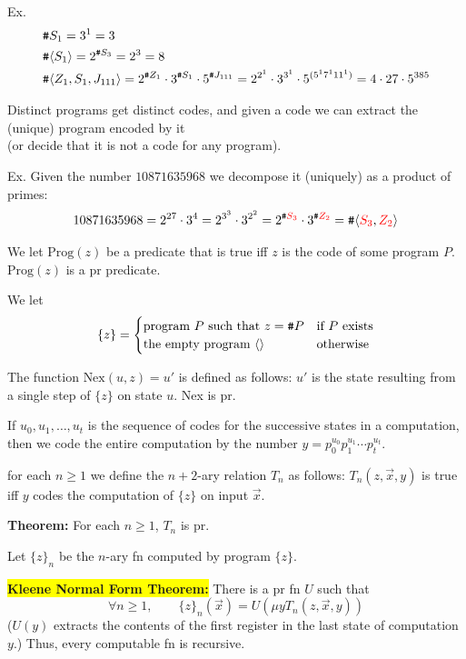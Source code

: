 \begin{frame}
Ex.  
\begin{align*}
& \texttt{\#} S_1=3^1=3 \\
& \texttt{\#} \langle S_1\rangle=2^{\texttt{\#} S_3}=2^3=8 \\
& \texttt{\#} \langle Z_1,S_1,J_{111}\rangle=2^{\texttt{\#} Z_1}\cdot
3^{\texttt{\#} S_1}\cdot 5^{\texttt{\#} J_{111}}=
2^{2^1}\cdot 3^{3^1}\cdot 5^{(5^17^111^1)}=4\cdot 27\cdot 5^{385}
\end{align*}

Distinct programs get distinct codes, and given a code we can extract
the (unique) program encoded by it \\
(or decide that it is not a code
for any program).

Ex. Given the number $10871635968$ we decompose it (uniquely) as a
product of primes:
$$
10871635968
=2^{27}\cdot 3^{4}
=2^{3^3}\cdot 3^{2^2}
=2^{\texttt{\#} \textcolor{red}{S_3}}\cdot 3^{\texttt{\#} \textcolor{red}{Z_2}}
=\texttt{\#}\langle \textcolor{red}{S_3},\textcolor{red}{Z_2}\rangle
$$
\end{frame}

\begin{frame}
We let $\text{Prog}(z)$ be a predicate that is true iff $z$ is the
code of some program $P$.  $\text{Prog}(z)$ is a pr predicate.


We let 
$$
\{z\}=\begin{cases}
\text{program $P$ such that $z=\texttt{\#} P$} & \text{if $P$ exists} \\
\text{the empty program $\langle\rangle$} & \text{otherwise}
\end{cases}
$$

The function $\text{Nex}(u,z)=u'$ is defined as follows: $u'$ is the
state resulting from a single step of $\{z\}$ on state $u$.  Nex is
pr.
\end{frame}

\begin{frame}
If $u_0,u_1,\ldots,u_t$ is the sequence of codes for the successive
states in a computation, then we code the entire computation by the
number $y=p_0^{u_0}p_1^{u_1}\cdots p_t^{u_t}$.  

 for each $n\ge 1$ we define the $n+2$-ary
relation $T_n$ as follows: $T_n(z,\vec{x},y)$ is true iff $y$ codes
the computation of $\{z\}$ on input $\vec{x}$.  

{\bf Theorem:} For each $n\ge 1$, $T_n$ is pr.

Let $\{z\}_n$ be the $n$-ary fn computed by program $\{z\}$.

\colorbox{yellow}{\bf Kleene Normal Form Theorem:}  
There is a pr fn $U$ such that
$$
\forall n\ge 1,\qquad
\{z\}_n(\vec{x})=U(\mu yT_n(z,\vec{x},y))
$$
($U(y)$ extracts the contents of the first register in the last state
of computation $y$.)  Thus, every computable fn is recursive.
\end{frame}

